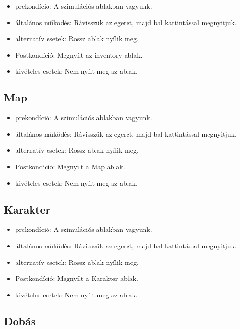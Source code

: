 \begin{itemize}
    \item prekondíció: A szimulációs ablakban vagyunk.
    \item általános működés: Rávisszük az egeret, majd bal kattintással megnyitjuk.
    \item alternatív esetek: Rossz ablak nyílik meg.
    \item Postkondíció: Megnyílt az inventory ablak.
    \item kivételes esetek: Nem nyílt meg az ablak.
\end{itemize}

\subsection{Map}

\begin{itemize}
    \item prekondíció: A szimulációs ablakban vagyunk.
    \item általános működés: Rávisszük az egeret, majd bal kattintással megnyitjuk.
    \item alternatív esetek: Rossz ablak nyílik meg.
    \item Postkondíció: Megnyílt a Map ablak.
    \item kivételes esetek: Nem nyílt meg az ablak.
\end{itemize}

\subsection{Karakter}

\begin{itemize}
    \item prekondíció: A szimulációs ablakban vagyunk.
    \item általános működés: Rávisszük az egeret, majd bal kattintással megnyitjuk.
    \item alternatív esetek: Rossz ablak nyílik meg.
    \item Postkondíció: Megnyílt a Karakter ablak.
    \item kivételes esetek: Nem nyílt meg az ablak.
\end{itemize}

\subsection{Dobás}

